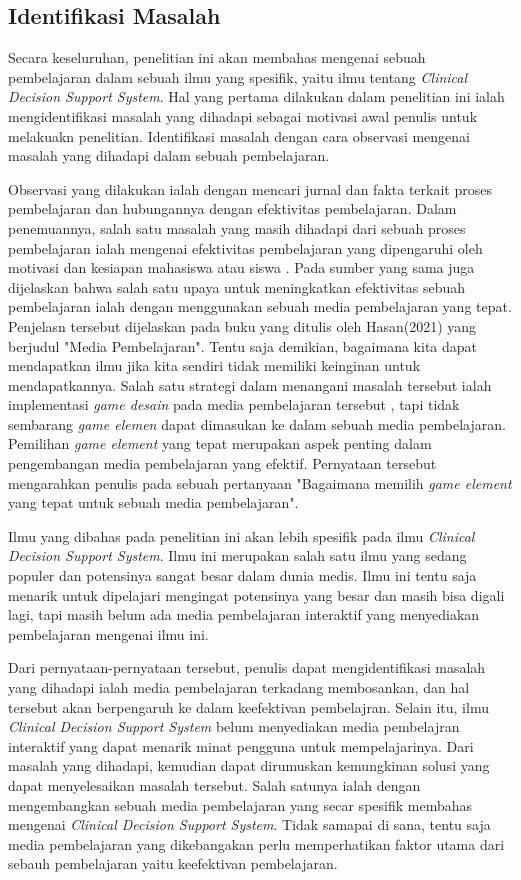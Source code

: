 \subsection{Identifikasi Masalah}
Secara keseluruhan, penelitian ini akan membahas mengenai sebuah pembelajaran dalam sebuah ilmu yang spesifik, yaitu ilmu tentang \textit{Clinical Decision Support System}.
Hal yang pertama dilakukan dalam penelitian ini ialah mengidentifikasi masalah yang dihadapi sebagai motivasi awal penulis untuk melakuakn penelitian.
Identifikasi masalah dengan cara observasi mengenai masalah yang dihadapi dalam sebuah pembelajaran. 	

Observasi yang dilakukan ialah dengan mencari jurnal dan fakta terkait proses pembelajaran dan hubungannya dengan efektivitas pembelajaran.
Dalam penemuannya, salah satu masalah yang masih dihadapi dari sebuah proses pembelajaran ialah mengenai efektivitas pembelajaran yang dipengaruhi oleh motivasi dan kesiapan mahasiswa atau siswa \cite{hasan2021media}.
Pada sumber yang sama juga dijelaskan bahwa salah satu upaya untuk meningkatkan efektivitas sebuah pembelajaran ialah dengan menggunakan sebuah media pembelajaran yang tepat.
Penjelasn tersebut dijelaskan pada buku yang ditulis oleh Hasan(2021) yang berjudul "Media Pembelajaran"\cite{hasan2021media}.
Tentu saja demikian, bagaimana kita dapat mendapatkan ilmu jika kita sendiri tidak memiliki keinginan untuk mendapatkannya.
Salah satu strategi dalam menangani masalah tersebut ialah implementasi \textit{game desain} pada media pembelajaran tersebut \cite{EnjoyLearningLikeGaming}, tapi tidak sembarang \textit{game elemen} dapat dimasukan ke dalam sebuah media pembelajaran.
Pemilihan \textit{game element} yang tepat merupakan aspek penting dalam pengembangan media pembelajaran yang efektif\cite{kapp2012gamification}. Pernyataan tersebut mengarahkan penulis pada sebuah pertanyaan "Bagaimana memilih \textit{game element} yang tepat untuk sebuah media pembelajaran".

Ilmu yang dibahas pada penelitian ini akan lebih spesifik pada ilmu \textit{Clinical Decision Support System}. Ilmu ini merupakan salah satu ilmu yang sedang populer dan potensinya sangat besar dalam dunia medis.
Ilmu ini tentu saja menarik untuk dipelajari mengingat potensinya yang besar dan masih bisa digali lagi, tapi masih belum ada media pembelajaran interaktif yang menyediakan pembelajaran mengenai ilmu ini.

Dari pernyataan-pernyataan tersebut, penulis dapat mengidentifikasi masalah yang dihadapi ialah media pembelajaran terkadang membosankan, dan hal tersebut akan berpengaruh ke dalam keefektivan pembelajran.
Selain itu, ilmu \textit{Clinical Decision Support System} belum menyediakan media pembelajran interaktif yang dapat menarik minat pengguna untuk mempelajarinya.
Dari masalah yang dihadapi, kemudian dapat dirumuskan kemungkinan solusi yang dapat menyelesaikan masalah tersebut. Salah satunya ialah dengan mengembangkan sebuah media pembelajaran yang secar spesifik membahas mengenai \textit{Clinical Decision Support System}.
Tidak samapai di sana, tentu saja media pembelajaran yang dikebangakan perlu memperhatikan faktor utama dari sebauh pembelajaran yaitu keefektivan pembelajaran.

